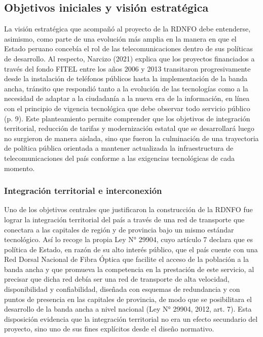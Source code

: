 \subsection{Objetivos iniciales y visión estratégica}
La visión estratégica que acompañó al proyecto de la RDNFO debe entenderse, asimismo, como parte de una evolución más amplia en la manera en que el Estado peruano concebía el rol de las telecomunicaciones dentro de sus políticas de desarrollo. Al respecto, Narcizo (2021) explica que los proyectos financiados a través del fondo FITEL entre los años 2006 y 2013 transitaron progresivamente desde la instalación de teléfonos públicos hasta la implementación de la banda ancha, tránsito que respondió tanto a la evolución de las tecnologías como a la necesidad de adaptar a la ciudadanía a la nueva era de la información, en línea con el principio de vigencia tecnológica que debe observar todo servicio público (p. 9). Este planteamiento permite comprender que los objetivos de integración territorial, reducción de tarifas y modernización estatal que se desarrollará luego no surgieron de manera aislada, sino que fueron la culminación de una trayectoria de política pública orientada a mantener actualizada la infraestructura de telecomunicaciones del país conforme a las exigencias tecnológicas de cada momento.
\subsubsection{Integración territorial e interconexión}
Uno de los objetivos centrales que justificaron la construcción de la RDNFO fue lograr la integración territorial del país a través de una red de transporte que conectara a las capitales de región y de provincia bajo un mismo estándar tecnológico. Así lo recoge la propia Ley N° 29904, cuyo artículo 7 declara que es política de Estado, en razón de su alto interés público, que el país cuente con una Red Dorsal Nacional de Fibra Óptica que facilite el acceso de la población a la banda ancha y que promueva la competencia en la prestación de este servicio, al precisar que dicha red debía ser una red de transporte de alta velocidad, disponibilidad y confiabilidad, diseñada con esquemas de redundancia y con puntos de presencia en las capitales de provincia, de modo que se posibilitara el desarrollo de la banda ancha a nivel nacional (Ley N° 29904, 2012, art. 7). Esta disposición evidencia que la integración territorial no era un efecto secundario del proyecto, sino uno de sus fines explícitos desde el diseño normativo.

